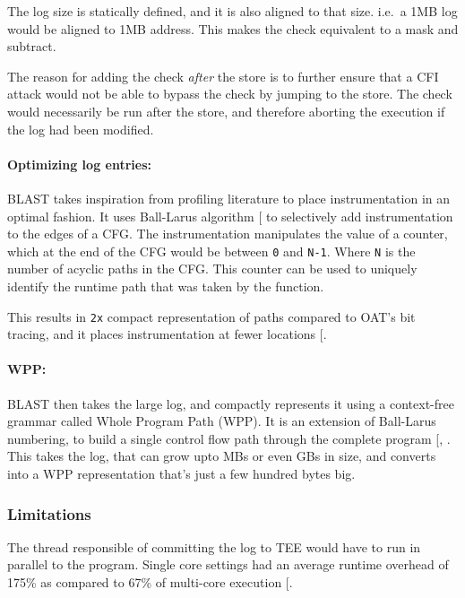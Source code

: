 \documentclass[a4paper, nobind]{templates/ociamthesis}
\begin{document}
The log size is statically defined, and it is also aligned to that size.
i.e.~a 1MB log would be aligned to 1MB address. This makes the check equivalent
to a mask and subtract.

The reason for adding the check \emph{after} the store is to further ensure that a
CFI attack would not be able to bypass the check by jumping to the store.
The check would necessarily be run after the store, and therefore aborting the
execution if the log had been modified.

\paragraph{Optimizing log entries:}\label{optimizing-log-entries}

BLAST takes inspiration from profiling literature to place instrumentation in
an optimal fashion. It uses Ball-Larus algorithm {[}\citeproc{ref-balllarus}{17}{]} to selectively
add instrumentation to the edges of a CFG. The instrumentation manipulates the value of a counter,
which at the end of the CFG would be between \texttt{0} and \texttt{N-1}. Where \texttt{N} is the number
of acyclic paths in the CFG. This counter can be used to uniquely identify the
runtime path that was taken by the function.

This results in \texttt{2x} compact representation of paths compared to OAT's bit tracing,
and it places instrumentation at fewer locations {[}\citeproc{ref-blast}{56}{]}.

\paragraph{WPP:}\label{wpp}

BLAST then takes the large log, and compactly represents it using a context-free
grammar called Whole Program Path (WPP). It is an extension of Ball-Larus numbering, to build a single
control flow path through the complete program {[}, \citeproc{ref-blast}{56}{]}.
This takes the log, that can grow upto MBs or even GBs in size, and converts into
a WPP representation that's just a few hundred bytes big.

\subsubsection{Limitations}\label{limitations}

The thread responsible of committing the log to TEE would have to run in parallel
to the program. Single core settings had an average runtime overhead of 175\%
as compared to 67\% of multi-core execution {[}\citeproc{ref-blast}{56}{]}.
\end{document}
